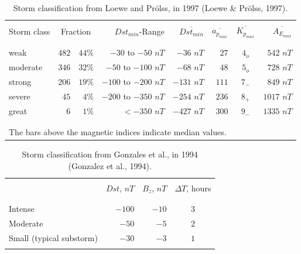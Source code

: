\documentclass[sn-mathphys-num]{sn-jnl}%
\begin{document}
\begin{table}[!ht]
    \centering
    \caption{Storm classification from Loewe and Prölss, in 1997 (Loewe & Prölss, 1997).}
    \label{tab:loewe1997}
    \begin{tabular}{lrrrrrcr}
        \hline
        \\
        Storm class & \multicolumn{2}{c}{Fraction} & $Dst_{min}$-Range & $\overline{Dst_{min}}$ & $\overline{a_{p_{max}}}$ & $\overline{K_{p_{max}}}$ & $\overline{A_{E_{max}}}$ \\
        \\
        \hline
        \\
        weak & $482$ & $44\%$ & $-30$ to $-50$ $nT$ & $-36$ $nT$ & $27$ & $4_{o}$ & $542$ $nT$ \\
        moderate & $346$ & $32\%$ & $-50$ to $-100$ $nT$ & $-68$ $nT$ & $48$ & $5_{o}$ & $728$ $nT$ \\
        strong & $206$ & $19\%$ & $-100$ to $-200$ $nT$ & $-131$ $nT$ & $111$ & $7_{-}$ & $849$ $nT$ \\
        severe & $45$ & $4\%$ & $-200$ to $-350$ $nT$ & $-254$ $nT$ & $236$ & $8_{+}$ & $1017$ $nT$ \\
        great & $6$ & $1\%$ & $<-350$ $nT$ & $-427$ $nT$ & $300$ & $9_{-}$ & $1335$ $nT$ \\
        \\
        \hline
        \\
        \multicolumn{8}{l}{The bars above the magnetic indices indicate median values.} \\
    \end{tabular}
\end{table}

\begin{table}[!ht]
    \centering
    \caption{Storm classification from Gonzales et al., in 1994 (Gonzalez et al., 1994).}
    \label{tab:gonzalez1994}
    \begin{tabular}{lrrc}
        \hline
        \\
         & $Dst$, $nT$ & $B_{z}$, $nT$ & $\Delta T$, hours \\
        \\
        \hline
        \\
        Intense & $-100$ & $-10$ & $3$ \\
        Moderate & $-50$ & $-5$ & $2$ \\
        Small (typical substorm) & $-30$ & $-3$ & $1$ \\
        \\
        \hline
    \end{tabular}
\end{table}
\end{document}
